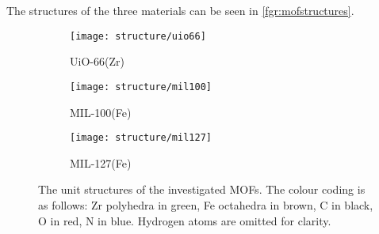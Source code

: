 The structures of the three materials can be seen in \autoref{fgr:mofstructures}.

\begin{figure}[t]
	\centering
	\begin{subfigure}{0.3\textwidth}
		\texttt{[image: structure/uio66]}
		\caption{UiO-66(Zr)}
	\end{subfigure}
	\begin{subfigure}{0.3\textwidth}
		\texttt{[image: structure/mil100]}
		\caption{MIL-100(Fe)}
	\end{subfigure}
	\begin{subfigure}{0.3\textwidth}
		\texttt{[image: structure/mil127]}
		\caption{MIL-127(Fe)}
	\end{subfigure}

	\caption{The unit structures of the investigated MOFs.
		The colour coding is as follows: Zr polyhedra in green,
		Fe octahedra in brown, C in black, O in red, N in blue.
		Hydrogen atoms are omitted for clarity.}
	\label{fgr:mofstructures}
\end{figure}